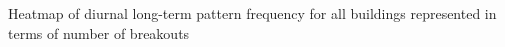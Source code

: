 Heatmap of diurnal long-term pattern frequency for all buildings represented in terms of number of breakouts
\label{fig:breakouts_all}
